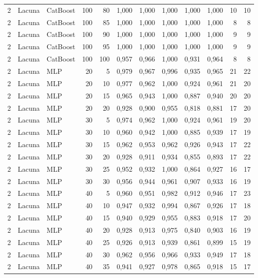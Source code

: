 \begin{longtable}{@{}rllrrrrrrrrr@{}}
2 & Lacuna & CatBoost & 100 & 80 & 1,000 & 1,000 & 1,000 & 1,000 & 1,000 & 10 & 10 \\
2 & Lacuna & CatBoost & 100 & 85 & 1,000 & 1,000 & 1,000 & 1,000 & 1,000 & 8 & 8 \\
2 & Lacuna & CatBoost & 100 & 90 & 1,000 & 1,000 & 1,000 & 1,000 & 1,000 & 9 & 9 \\
2 & Lacuna & CatBoost & 100 & 95 & 1,000 & 1,000 & 1,000 & 1,000 & 1,000 & 9 & 9 \\
2 & Lacuna & CatBoost & 100 & 100 & 0,957 & 0,966 & 1,000 & 0,931 & 0,964 & 8 & 8 \\
2 & Lacuna & MLP & 20 & 5 & 0,979 & 0,967 & 0,996 & 0,935 & 0,965 & 21 & 22 \\
2 & Lacuna & MLP & 20 & 10 & 0,977 & 0,962 & 1,000 & 0,924 & 0,961 & 21 & 20 \\
2 & Lacuna & MLP & 20 & 15 & 0,965 & 0,943 & 1,000 & 0,887 & 0,940 & 20 & 20 \\
2 & Lacuna & MLP & 20 & 20 & 0,928 & 0,900 & 0,955 & 0,818 & 0,881 & 17 & 20 \\
2 & Lacuna & MLP & 30 & 5 & 0,974 & 0,962 & 1,000 & 0,924 & 0,961 & 19 & 20 \\
2 & Lacuna & MLP & 30 & 10 & 0,960 & 0,942 & 1,000 & 0,885 & 0,939 & 17 & 19 \\
2 & Lacuna & MLP & 30 & 15 & 0,962 & 0,953 & 0,962 & 0,926 & 0,943 & 17 & 22 \\
2 & Lacuna & MLP & 30 & 20 & 0,928 & 0,911 & 0,934 & 0,855 & 0,893 & 17 & 22 \\
2 & Lacuna & MLP & 30 & 25 & 0,952 & 0,932 & 1,000 & 0,864 & 0,927 & 16 & 17 \\
2 & Lacuna & MLP & 30 & 30 & 0,956 & 0,944 & 0,961 & 0,907 & 0,933 & 16 & 19 \\
2 & Lacuna & MLP & 40 & 5 & 0,960 & 0,951 & 0,982 & 0,912 & 0,946 & 17 & 23 \\
2 & Lacuna & MLP & 40 & 10 & 0,947 & 0,932 & 0,994 & 0,867 & 0,926 & 17 & 18 \\
2 & Lacuna & MLP & 40 & 15 & 0,940 & 0,929 & 0,955 & 0,883 & 0,918 & 17 & 20 \\
2 & Lacuna & MLP & 40 & 20 & 0,928 & 0,913 & 0,975 & 0,840 & 0,903 & 16 & 19 \\
2 & Lacuna & MLP & 40 & 25 & 0,926 & 0,913 & 0,939 & 0,861 & 0,899 & 15 & 19 \\
2 & Lacuna & MLP & 40 & 30 & 0,962 & 0,956 & 0,966 & 0,933 & 0,949 & 17 & 18 \\
2 & Lacuna & MLP & 40 & 35 & 0,941 & 0,927 & 0,978 & 0,865 & 0,918 & 15 & 17 \\

\end{longtable}
